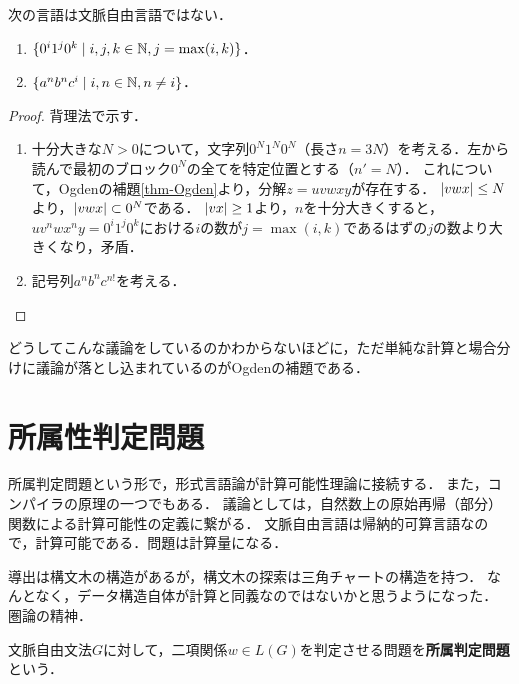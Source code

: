 \documentclass[uplatex, dvipdfmx]{jsreport}
\begin{document}
\begin{corollary}
    次の言語は文脈自由言語ではない．
    \begin{enumerate}
        \item $\{0^i1^j0^k\mid i,j,k\in\mathbb{N},j=\max(i,k)\}$．
        \item $\{a^nb^nc^i\mid i,n\in\mathbb{N}, n\ne i\}$．
    \end{enumerate}
\end{corollary}
\begin{proof}
    背理法で示す．
    \begin{enumerate}
        \item 
        十分大きな$N>0$について，文字列$0^N1^N0^N$（長さ$n=3N$）を考える．左から読んで最初のブロック$0^N$の全てを特定位置とする（$n'=N$）．
        これについて，Ogdenの補題\ref{thm-Ogden}より，分解$z=uvwxy$が存在する．
        $\lvert vwx\rvert\le N$より，$\lvert vwx\rvert\subset 0^N$である．
        $\lvert vx\rvert\ge 1$より，$n$を十分大きくすると，$uv^nwx^ny=0^i1^j0^k$における$i$の数が$j=\max(i,k)$であるはずの$j$の数より大きくなり，矛盾．
        \item 記号列$a^nb^nc^{n!}$を考える．
        
    \end{enumerate}
\end{proof}
\begin{remarks}
    どうしてこんな議論をしているのかわからないほどに，ただ単純な計算と場合分けに議論が落とし込まれているのがOgdenの補題である．
\end{remarks}

\section{所属性判定問題}

\begin{tcolorbox}[colframe=ForestGreen, colback=ForestGreen!10!white, breakable]
    所属判定問題という形で，形式言語論が計算可能性理論に接続する．
    また，コンパイラの原理の一つでもある．
    議論としては，自然数上の原始再帰（部分）関数による計算可能性の定義に繋がる．
    文脈自由言語は帰納的可算言語なので，計算可能である．問題は計算量になる．

    導出は構文木の構造があるが，構文木の探索は三角チャートの構造を持つ．
    なんとなく，データ構造自体が計算と同義なのではないかと思うようになった．
    圏論の精神．
\end{tcolorbox}

\begin{definition}
    文脈自由文法$G$に対して，二項関係$w\in L(G)$を判定させる問題を\textbf{所属判定問題}という．
\end{definition}
\end{document}
